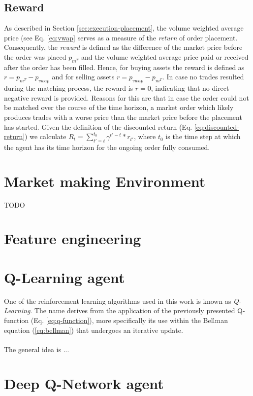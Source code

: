 \subsection{Reward}
As described in Section \ref{sec:execution-placement}, the volume weighted average price (see Eq. \ref{eq:vwap} serves as a measure of the \textit{return} of order placement.
Consequently, the \textit{reward} is defined as the difference of the market price before the order was placed $p_{m^T}$ and the volume weighted average price paid or received after the order has been filled. 
Hence, for buying assets the reward is defined as $r=p_{m^T}-p_{vwap}$ and for selling assets $r=p_{vwap}-p_{m^T}$.
In case no trades resulted during the matching process, the reward is $r=0$, indicating that no direct negative reward is provided.
Reasons for this are that in case the order could not be matched over the course of the time horizon, a market order which likely produces trades with a worse price than the market price before the placement has started.
Given the definition of the discounted return (Eq. \ref{eq:discounted-return}) we calculate $R_t=\sum_{t'=t}^{t_0}{\gamma^{t'-t}*r_{t'}}$, where $t_0$ is the time step at which the agent has its time horizon for the ongoing order fully consumed.

\section{Market making Environment}

TODO

\section{Feature engineering}
\label{sec:feature-engineering}



\section{Q-Learning agent}

One of the reinforcement learning algorithms used in this work is known as \textit{Q-Learning}. 
The name derives from the application of the previously presented Q-function (Eq. \ref{eq:q-function}), more specifically its use within the Bellman equation (\ref{eq:bellman}) that undergoes an iterative update.
\\
\\
The general idea is ... 

\section{Deep Q-Network agent}
